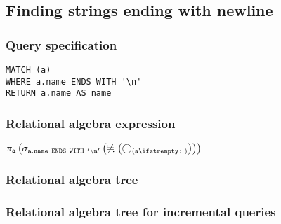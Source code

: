 \subsection{Finding strings ending with newline}

\subsubsection*{Query specification}

\begin{lstlisting}
MATCH (a)
WHERE a.name ENDS WITH '\n'
RETURN a.name AS name
\end{lstlisting}

\subsubsection*{Relational algebra expression}

$\projection{\var{a}} \left(\selection{\mathtt{a.name~ENDS~WITH~'\backslash{}n'}} \left(\alldifferent{} \left(\getvertices{a}{}\right)\right)\right)$

\subsubsection*{Relational algebra tree}


\subsubsection*{Relational algebra tree for incremental queries}


